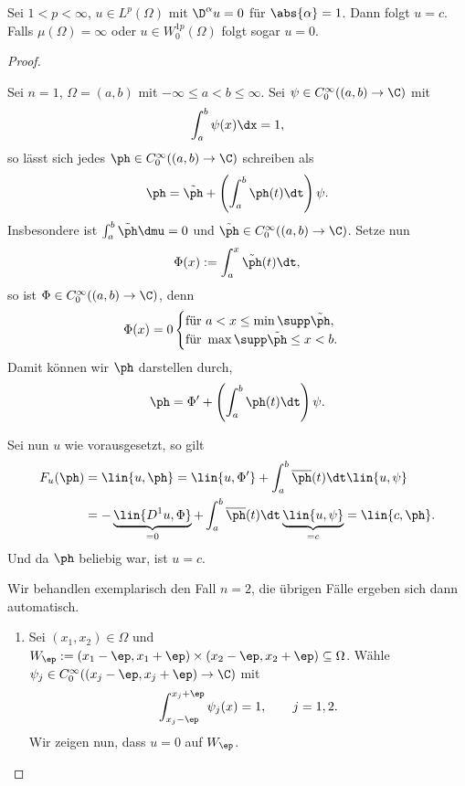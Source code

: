 \begin{prop}
\label{prop:7.37}
Sei $1<p<\infty$, $u\in L^p(\Omega)$ mit $\D^\alpha u=0$ für $\abs{\alpha}=1$.
Dann folgt $u=c$. Falls $\mu(\Omega)=\infty$ oder $u\in W_0^{1p}(\Omega)$ folgt
sogar $u=0$.\fishhere
\end{prop}
\begin{proof}
\begin{proofenum}
\item Sei $n=1$, $\Omega=(a,b)$ mit $-\infty\le a < b \le \infty$. Sei $\psi\in
C_0^\infty((a,b)\to \C)$ mit
\begin{align*}
\int_a^b \psi(x)\dx = 1,
\end{align*}
so lässt sich jedes $\ph\in C_0^\infty((a,b)\to\C)$ schreiben als
\begin{align*}
\ph = \tilde{\ph} + \left(\int_a^b \ph(t)\dt\right)\psi.
\end{align*}
Insbesondere ist $\int_a^b \tilde{\ph}\dmu = 0$ und $\tilde{\ph}\in C_0^\infty
((a,b)\to\C)$. Setze nun
\begin{align*}
\Phi(x) := \int_a^x \tilde{\ph}(t)\dt,
\end{align*}
so ist $\Phi\in C_0^\infty((a,b)\to\C)$, denn
\begin{align*}
\Phi(x) = 0
\begin{cases}
\text{für } a<x \le \min\supp\tilde{\ph},\\
\text{für } \max\supp\tilde{\ph}\le x < b.
\end{cases}
\end{align*}
Damit können wir $\ph$ darstellen durch,
\begin{align*}
\ph = \Phi' + \left(\int_a^b \ph(t)\dt\right)\psi. 
\end{align*}

Sei nun $u$ wie vorausgesetzt, so gilt
\begin{align*}
F_u(\ph) &= \lin{u,\ph} = \lin{u,\Phi'}
+ \int_a^b \overline{\ph}(t)\dt \lin{u,\psi}\\
&= -\underbrace{\lin{D^1u,\Phi}}_{=0} + \int_a^b \overline{\ph}(t)\dt
\underbrace{\lin{u,\psi}}_{=c} = \lin{c,\ph}.
\end{align*}
Und da $\ph$ beliebig war, ist $u=c$.
\item Wir behandlen exemplarisch den Fall $n=2$, die übrigen Fälle ergeben sich
dann automatisch.
\begin{enumerate}[label=\alph{*}),leftmargin=0pt]
  \item Sei $(x_1,x_2)\in\Omega$ und $W_\ep :=
  (x_1-\ep,x_1+\ep)\times(x_2-\ep,x_2+\ep)\subseteq \Omega$. Wähle $\psi_j\in
  C_0^\infty((x_j-\ep,x_j+\ep)\to\C)$ mit
\begin{align*}
\int_{x_j-\ep}^{x_j+\ep} \psi_j(x) = 1,\qquad j=1,2.
\end{align*}
Wir zeigen nun, dass $u=0$ auf $W_\ep$.


\end{enumerate}
\end{proofenum}
\end{proof}
